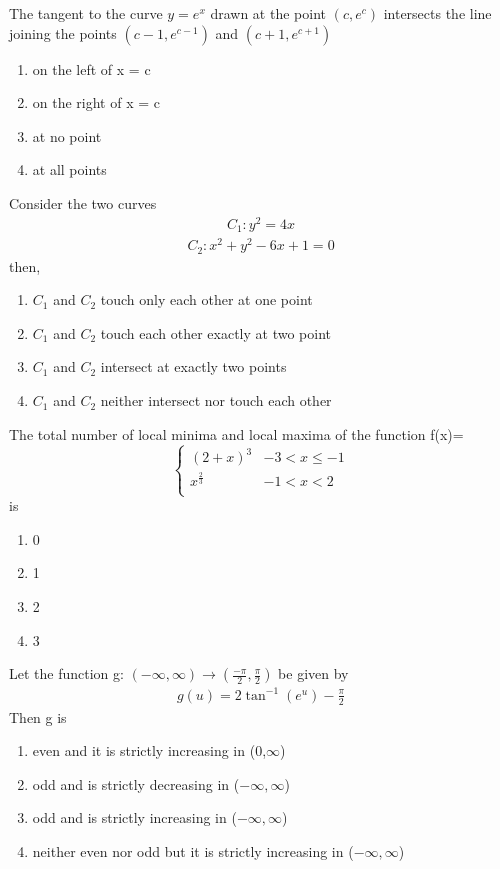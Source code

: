 \item The tangent to the curve $y = e^x$ drawn at the point $(c, e^c)$ intersects the line joining the points 
$(c - 1, e^{c - 1})$ and $(c + 1, e^{c + 1})$ 
\begin{enumerate}
\item on the left of x = c
\item on the right of x = c
\item at no point 
\item at all points
\end{enumerate}

\item Consider the two curves
\begin{align*}
C_1: y^2 = 4x
\end{align*}
\begin{align*}
C_2: x^2 + y^2 - 6x + 1 = 0 
\end{align*}
then,
\begin{enumerate}
\item $C_1$ and $C_2$ touch only each other at one point
\item $C_1$ and $C_2$ touch each other exactly at two point
\item $C_1$ and $C_2$ intersect at exactly two points
\item $C_1$ and $C_2$ neither intersect nor touch each other
\end{enumerate}

\item The total number of local minima and local maxima of the function 
f(x)=
\[ \begin{cases} 
      (2 + x)^3 &  -3 < x \leq -1 \\
      x^{\frac{2}{3}}& -1 < x < 2\\
   \end{cases}
\]
is 
\begin{enumerate}
\item 0
\item 1
\item 2
\item 3
\end{enumerate}

\item Let the function g: $(-\infty, \infty) \to (\frac{-\pi}{2}, \frac{\pi}{2})$ be given by 
\begin{align*}
g(u) = 2\tan^{-1}(e^u) - \frac{\pi}{2}
\end{align*}
 Then g is
\begin{enumerate}
\item even and it is strictly increasing in (0,$\infty$)
\item odd and is strictly decreasing in ($-\infty,\infty$)
\item odd and is strictly increasing in ($-\infty,\infty$)
\item neither even nor odd but it is strictly increasing in ($-\infty,\infty$)  
\end{enumerate}

